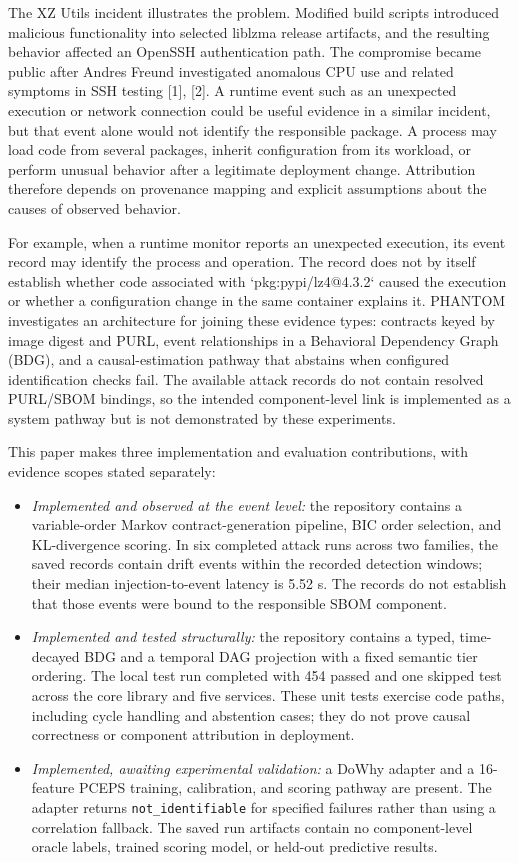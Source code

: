\documentclass[conference]{IEEEtran}
\begin{document}
The XZ Utils incident illustrates the problem. Modified build scripts introduced malicious functionality into selected liblzma release artifacts, and the resulting behavior affected an OpenSSH authentication path. The compromise became public after Andres Freund investigated anomalous CPU use and related symptoms in SSH testing [1], [2]. A runtime event such as an unexpected execution or network connection could be useful evidence in a similar incident, but that event alone would not identify the responsible package. A process may load code from several packages, inherit configuration from its workload, or perform unusual behavior after a legitimate deployment change. Attribution therefore depends on provenance mapping and explicit assumptions about the causes of observed behavior.

For example, when a runtime monitor reports an unexpected execution, its event record may identify the process and operation. The record does not by itself establish whether code associated with `pkg:pypi/lz4@4.3.2` caused the execution or whether a configuration change in the same container explains it. PHANTOM investigates an architecture for joining these evidence types: contracts keyed by image digest and PURL, event relationships in a Behavioral Dependency Graph (BDG), and a causal-estimation pathway that abstains when configured identification checks fail. The available attack records do not contain resolved PURL/SBOM bindings, so the intended component-level link is implemented as a system pathway but is not demonstrated by these experiments.

This paper makes three implementation and evaluation contributions, with evidence scopes stated separately:
\begin{itemize}
\item \emph{Implemented and observed at the event level:} the repository contains a variable-order Markov contract-generation pipeline, BIC order selection, and KL-divergence scoring. In six completed attack runs across two families, the saved records contain drift events within the recorded detection windows; their median injection-to-event latency is 5.52 s. The records do not establish that those events were bound to the responsible SBOM component.
\item \emph{Implemented and tested structurally:} the repository contains a typed, time-decayed BDG and a temporal DAG projection with a fixed semantic tier ordering. The local test run completed with 454 passed and one skipped test across the core library and five services. These unit tests exercise code paths, including cycle handling and abstention cases; they do not prove causal correctness or component attribution in deployment.
\item \emph{Implemented, awaiting experimental validation:} a DoWhy adapter and a 16-feature PCEPS training, calibration, and scoring pathway are present. The adapter returns \texttt{not\_identifiable} for specified failures rather than using a correlation fallback. The saved run artifacts contain no component-level oracle labels, trained scoring model, or held-out predictive results.
\end{itemize}
\end{document}
